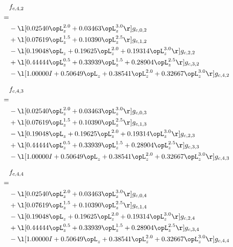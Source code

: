 \begin{alignat}{2} 
\label{eq:f_42_0} 
& f_{c,4,2} \nonumber \\ 
 = \\ 
& - \l[  0.02540 \opL_z^{2.0} +  0.03463 \opL_z^{3.0}  \r] g_{c,0,2} \nonumber \\ 
& + \l[  0.07619 \opL_z^{1.5} +  0.10390 \opL_z^{2.5}  \r] g_{c,1,2} \nonumber \\ 
& - \l[  0.19048 \opL_z +  0.19625 \opL_z^{2.0} +  0.19314 \opL_z^{3.0}  \r] g_{c,2,2} \nonumber \\ 
& + \l[  0.44444 \opL_z^{0.5} +  0.33939 \opL_z^{1.5} +  0.28904 \opL_z^{2.5}  \r] g_{c,3,2} \nonumber \\ 
& - \l[  1.00000 I +  0.50649 \opL_z +  0.38541 \opL_z^{2.0} +  0.32667 \opL_z^{3.0}  \r] g_{c,4,2} \nonumber \\ 
\end{alignat} 


\begin{alignat}{2} 
\label{eq:f_43_0} 
& f_{c,4,3} \nonumber \\ 
 = \\ 
& - \l[  0.02540 \opL_z^{2.0} +  0.03463 \opL_z^{3.0}  \r] g_{c,0,3} \nonumber \\ 
& + \l[  0.07619 \opL_z^{1.5} +  0.10390 \opL_z^{2.5}  \r] g_{c,1,3} \nonumber \\ 
& - \l[  0.19048 \opL_z +  0.19625 \opL_z^{2.0} +  0.19314 \opL_z^{3.0}  \r] g_{c,2,3} \nonumber \\ 
& + \l[  0.44444 \opL_z^{0.5} +  0.33939 \opL_z^{1.5} +  0.28904 \opL_z^{2.5}  \r] g_{c,3,3} \nonumber \\ 
& - \l[  1.00000 I +  0.50649 \opL_z +  0.38541 \opL_z^{2.0} +  0.32667 \opL_z^{3.0}  \r] g_{c,4,3} \nonumber \\ 
\end{alignat} 


\begin{alignat}{2} 
\label{eq:f_44_0} 
& f_{c,4,4} \nonumber \\ 
 = \\ 
& - \l[  0.02540 \opL_z^{2.0} +  0.03463 \opL_z^{3.0}  \r] g_{c,0,4} \nonumber \\ 
& + \l[  0.07619 \opL_z^{1.5} +  0.10390 \opL_z^{2.5}  \r] g_{c,1,4} \nonumber \\ 
& - \l[  0.19048 \opL_z +  0.19625 \opL_z^{2.0} +  0.19314 \opL_z^{3.0}  \r] g_{c,2,4} \nonumber \\ 
& + \l[  0.44444 \opL_z^{0.5} +  0.33939 \opL_z^{1.5} +  0.28904 \opL_z^{2.5}  \r] g_{c,3,4} \nonumber \\ 
& - \l[  1.00000 I +  0.50649 \opL_z +  0.38541 \opL_z^{2.0} +  0.32667 \opL_z^{3.0}  \r] g_{c,4,4} \nonumber \\ 
\end{alignat} 


